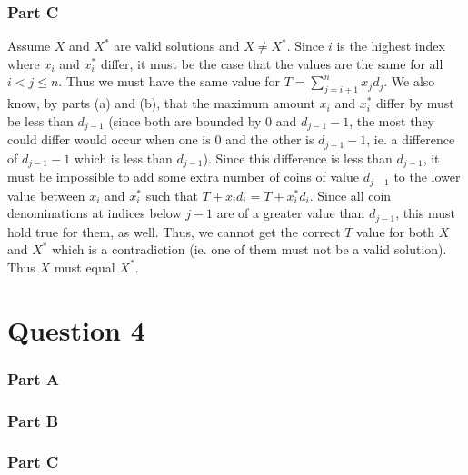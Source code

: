 \documentclass[12pt]{article}
\begin{document}
\subsubsection*{Part C}
Assume $X$ and $X^*$ are valid solutions and $X \neq X^*$. Since $i$ is the highest index where $x_i$ and $x^*_i$ differ, it must be the case that the values are the same for all $i < j \leq n$. Thus we must have the same value for $T = \displaystyle\sum_{j=i+1}^n x_j d_j$. We also know, by parts (a) and (b), that the maximum amount $x_i$ and $x^*_i$ differ by must be less than $d_{j-1}$ (since both are bounded by $0$ and $d_{j-1} - 1$, the most they could differ would occur when one is $0$ and the other is $d_{j-1} - 1$, ie. a difference of $d_{j-1} - 1$ which is less than $d_{j-1}$). Since this difference is less than $d_{j-1}$, it must be impossible to add some extra number of coins of value $d_{j-1}$ to the lower value between $x_i$ and $x^*_i$ such that $T + x_i d_i = T + x^*_i d_i$. Since all coin denominations at indices below $j-1$ are of a greater value than $d_{j-1}$, this must hold true for them, as well. Thus, we cannot get the correct $T$ value for both $X$ and $X^*$ which is a contradiction (ie. one of them must not be a valid solution). Thus $X$ must equal $X^*$.

\section*{Question 4}
\subsubsection*{Part A}
\subsubsection*{Part B}
\subsubsection*{Part C}
\end{document}
